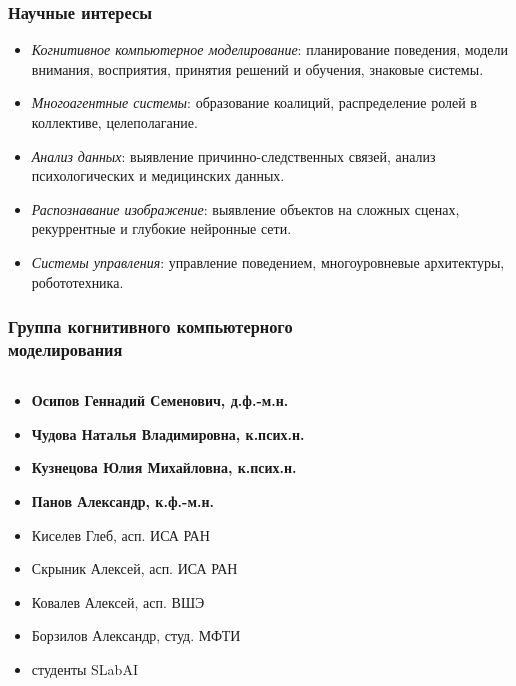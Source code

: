 \documentclass[default]{beamer}
\begin{document}
	\begin{frame}
		\frametitle{Научные интересы}
		
		\begin{itemize}
			\item \textit{Когнитивное компьютерное моделирование}: планирование поведения, модели внимания, восприятия, принятия решений и обучения, знаковые системы.
			\item \textit{Многоагентные системы}: образование коалиций, распределение ролей в коллективе, целеполагание.
			\item \textit{Анализ данных}: выявление причинно-следственных связей, анализ психологических и медицинских данных.
			\item \textit{Распознавание изображение}: выявление объектов на сложных сценах, рекуррентные и глубокие нейронные сети.
			\item \textit{Системы управления}: управление поведением, многоуровневые архитектуры, робототехника.
		\end{itemize}
	\end{frame}
	
	\begin{frame}
		\frametitle{Группа когнитивного компьютерного\\моделирования}
		\small
		\begin{columns}
			\begin{column}{0.65\textwidth}
				\vspace{-10pt}
				\begin{itemize}
					\item \textbf{Осипов Геннадий Семенович, д.ф.-м.н.}
					\item \textbf{Чудова Наталья Владимировна, к.псих.н.}
					\item \textbf{Кузнецова Юлия Михайловна, к.псих.н.}
					\item \textbf{Панов Александр, к.ф.-м.н.}
					\item Киселев Глеб, асп. ИСА РАН
					\item Скрыник Алексей, асп. ИСА РАН
					\item Ковалев Алексей, асп. ВШЭ
					\item Борзилов Александр, студ. МФТИ
					\item студенты SLabAI
				\end{itemize}
			\end{column}
			\begin{column}{0.35\textwidth}
			\end{column}
		\end{columns}		
	\end{frame}	
		
\end{document}
